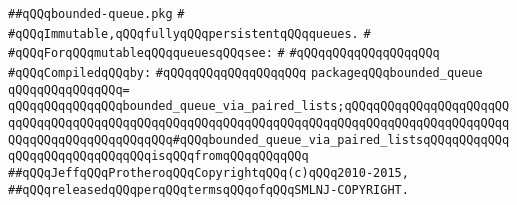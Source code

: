\label{src/lib/src/bounded-queue.pkg}
\verb|##qQQqbounded-queue.pkg|\newline
\verb|#|\newline
\verb|#qQQqImmutable,qQQqfullyqQQqpersistentqQQqqueues.|\newline
\verb|#|\newline
\verb|#qQQqForqQQqmutableqQQqqueuesqQQqsee:|\newline
\verb|#|\newline
\verb|#qQQqqQQqqQQqqQQqqQQq|\newline
\newline
\verb|#qQQqCompiledqQQqby:|\newline
\verb|#qQQqqQQqqQQqqQQqqQQq|\newline
\newline
\verb|packageqQQqbounded_queue|\newline
\verb|qQQqqQQqqQQqqQQq=|\newline
\verb|qQQqqQQqqQQqqQQqbounded_queue_via_paired_lists;qQQqqQQqqQQqqQQqqQQqqQQqqQQqqQQqqQQqqQQqqQQqqQQqqQQqqQQqqQQqqQQqqQQqqQQqqQQqqQQqqQQqqQQqqQQqqQQqqQQqqQQqqQQqqQQqqQQq#qQQqbounded_queue_via_paired_listsqQQqqQQqqQQqqQQqqQQqqQQqqQQqqQQqisqQQqfromqQQqqQQqqQQq|\newline
\newline
\newline
\newline
\verb|##qQQqJeffqQQqProtheroqQQqCopyrightqQQq(c)qQQq2010-2015,|\newline
\verb|##qQQqreleasedqQQqperqQQqtermsqQQqofqQQqSMLNJ-COPYRIGHT.|\newline

